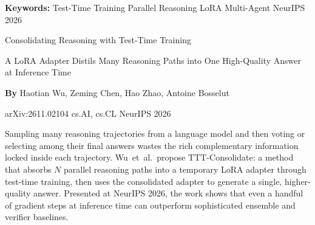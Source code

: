 \documentclass[10pt,twocolumn]{article}
\begin{document}
\setlength{\parindent}{0pt}
\setlength{\parskip}{4pt}

{\small\color{keywordgray}\textbf{Keywords:}
  Test-Time Training \textbullet{} Parallel Reasoning \textbullet{} LoRA \textbullet{} Multi-Agent \textbullet{} NeurIPS 2026}\par\vspace{4pt}

{\LARGE\bfseries\raggedright Consolidating Reasoning with Test-Time Training}\par\vspace{4pt}
{\large\itshape\raggedright A LoRA Adapter Distils Many Reasoning Paths into One High-Quality Answer at Inference Time}\par\vspace{6pt}
{\small\textbf{By} Haotian Wu, Zeming Chen, Hao Zhao, Antoine Bosselut}\par\vspace{2pt}
{\small\color{keywordgray}arXiv:2611.02104 \textbullet{} cs.AI, cs.CL \textbullet{} NeurIPS 2026}
\par\vspace{2pt}\noindent{\color{rulered}\rule{\columnwidth}{0.6pt}}\vspace{6pt}

Sampling many reasoning trajectories from a language model and then voting or selecting among their final answers wastes the rich complementary information locked inside each trajectory.
Wu~et~al.\ propose TTT-Consolidate: a method that absorbs $N$ parallel reasoning paths into a temporary LoRA adapter through test-time training, then uses the consolidated adapter to generate a single, higher-quality answer.
Presented at NeurIPS 2026, the work shows that even a handful of gradient steps at inference time can outperform sophisticated ensemble and verifier baselines.
\end{document}
